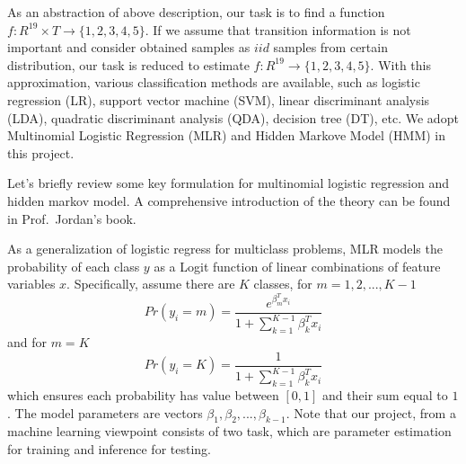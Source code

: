 As an abstraction of above description, our task is to find a function $f: R^{19}\times T \rightarrow \{1,2,3,4,5\}$. If we assume that transition information is not important and consider obtained samples as $iid$ samples from certain distribution, our task is reduced to estimate $f: R^{19} \rightarrow \{1,2,3,4,5\}$. With this approximation, various classification methods are available, such as logistic regression (LR), support vector machine (SVM), linear discriminant analysis (LDA), quadratic discriminant analysis (QDA), decision tree (DT), etc. We adopt Multinomial Logistic Regression (MLR) and Hidden Markove Model (HMM) in this project.


Let's briefly review some key formulation for multinomial logistic regression and hidden markov model. A comprehensive introduction of the theory can be found in Prof.~Jordan's book.

As a generalization of logistic regress for multiclass problems, MLR models the probability of each class $y$ as a Logit function of linear combinations of feature variables $x$. Specifically, assume there are $K$ classes, for $m=1,2,...,K-1$
\begin{equation}
Pr(y_i=m) = \frac{e^{\beta_m^Tx_i}}{1+\sum_{k=1}^{K-1}\beta_k^Tx_i}
\end{equation}
and for $m=K$
\begin{equation}
Pr(y_i=K) = \frac{1}{1+\sum_{k=1}^{K-1}\beta_k^Tx_i}
\end{equation}
which ensures each probability has value between $[0,1]$ and their sum equal to $1$. The model parameters are vectors $\beta_1,\beta_2,...,\beta_{k-1}$. Note that our project, from a machine learning viewpoint consists of two task, which are parameter estimation for training and inference for testing. 

